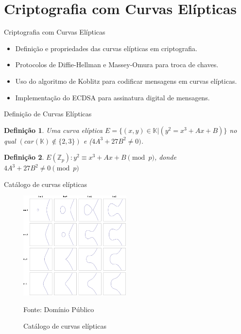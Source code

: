 \documentclass[brazil]{beamer}
\newtheorem{definicao}{Definição}\theoremstyle{definition}
\newcommand{\Z}{\mathbb{Z}}
\newcommand{\K}{\mathbb{K}}
\begin{document}
\section{Criptografia com Curvas Elípticas}
\begin{frame}
	\tableofcontents[currentsection]
\end{frame}
\begin{frame}{Criptografia com Curvas Elípticas}
	\justifying
	\begin{itemize}[label={$\bullet$}]
		\item Definição e propriedades das curvas elípticas em criptografia.
		\item Protocolos de Diffie-Hellman e Massey-Omura para troca de chaves.
		\item Uso do algoritmo de Koblitz para codificar mensagens em curvas elípticas.
		\item Implementação do ECDSA para assinatura digital de mensagens.
	\end{itemize}

\end{frame}

\begin{frame}{Definição de Curvas Elípticas}
	\begin{definicao}
		Uma curva elíptica $E  = \{(x, y) \in \K | (y^2 = x^3 + Ax + B)\}$ no qual $(car(\K) \notin \{2,3\})$
		e ($4A^3 +27B^2 \neq 0)$.
	\end{definicao}

	\begin{definicao}
		$E(\Z_{p}): y^2 \equiv x^3 + Ax + B \pmod{p}$, donde $4A^3 +27B^2 \neq 0 \pmod{p}$
	\end{definicao}


\end{frame}
\begin{frame}{Catálogo de curvas elípticas}

	\begin{figure}[h!] \centering
		\includegraphics[width=0.5\textwidth]{../Imagens/ellipticcurvecatalog}
		\caption{Catálogo de curvas elípticas}
		Fonte: Domínio Público
	\end{figure}
\end{frame}
\end{document}
